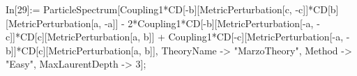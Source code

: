 In[29]:= ParticleSpectrum[Coupling1*CD[-b][MetricPerturbation[c, -c]]*CD[b][MetricPerturbation[a, -a]] - 2*Coupling1*CD[-b][MetricPerturbation[-a, -c]]*CD[c][MetricPerturbation[a, b]] + Coupling1*CD[-c][MetricPerturbation[-a, -b]]*CD[c][MetricPerturbation[a, b]], TheoryName -> "MarzoTheory", Method -> "Easy", MaxLaurentDepth -> 3]; 